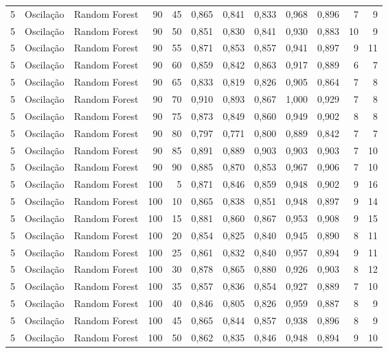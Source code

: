 \begin{longtable}{@{}rllrrrrrrrrr@{}}
5 & Oscilação & Random Forest & 90 & 45 & 0,865 & 0,841 & 0,833 & 0,968 & 0,896 & 7 & 9 \\
5 & Oscilação & Random Forest & 90 & 50 & 0,851 & 0,830 & 0,841 & 0,930 & 0,883 & 10 & 9 \\
5 & Oscilação & Random Forest & 90 & 55 & 0,871 & 0,853 & 0,857 & 0,941 & 0,897 & 9 & 11 \\
5 & Oscilação & Random Forest & 90 & 60 & 0,859 & 0,842 & 0,863 & 0,917 & 0,889 & 6 & 7 \\
5 & Oscilação & Random Forest & 90 & 65 & 0,833 & 0,819 & 0,826 & 0,905 & 0,864 & 7 & 8 \\
5 & Oscilação & Random Forest & 90 & 70 & 0,910 & 0,893 & 0,867 & 1,000 & 0,929 & 7 & 8 \\
5 & Oscilação & Random Forest & 90 & 75 & 0,873 & 0,849 & 0,860 & 0,949 & 0,902 & 8 & 8 \\
5 & Oscilação & Random Forest & 90 & 80 & 0,797 & 0,771 & 0,800 & 0,889 & 0,842 & 7 & 7 \\
5 & Oscilação & Random Forest & 90 & 85 & 0,891 & 0,889 & 0,903 & 0,903 & 0,903 & 7 & 10 \\
5 & Oscilação & Random Forest & 90 & 90 & 0,885 & 0,870 & 0,853 & 0,967 & 0,906 & 7 & 10 \\
5 & Oscilação & Random Forest & 100 & 5 & 0,871 & 0,846 & 0,859 & 0,948 & 0,902 & 9 & 16 \\
5 & Oscilação & Random Forest & 100 & 10 & 0,865 & 0,838 & 0,851 & 0,948 & 0,897 & 9 & 14 \\
5 & Oscilação & Random Forest & 100 & 15 & 0,881 & 0,860 & 0,867 & 0,953 & 0,908 & 9 & 15 \\
5 & Oscilação & Random Forest & 100 & 20 & 0,854 & 0,825 & 0,840 & 0,945 & 0,890 & 8 & 11 \\
5 & Oscilação & Random Forest & 100 & 25 & 0,861 & 0,832 & 0,840 & 0,957 & 0,894 & 9 & 11 \\
5 & Oscilação & Random Forest & 100 & 30 & 0,878 & 0,865 & 0,880 & 0,926 & 0,903 & 8 & 12 \\
5 & Oscilação & Random Forest & 100 & 35 & 0,857 & 0,836 & 0,854 & 0,927 & 0,889 & 7 & 10 \\
5 & Oscilação & Random Forest & 100 & 40 & 0,846 & 0,805 & 0,826 & 0,959 & 0,887 & 8 & 9 \\
5 & Oscilação & Random Forest & 100 & 45 & 0,865 & 0,844 & 0,857 & 0,938 & 0,896 & 8 & 9 \\
5 & Oscilação & Random Forest & 100 & 50 & 0,862 & 0,835 & 0,846 & 0,948 & 0,894 & 9 & 10 \\

\end{longtable}
